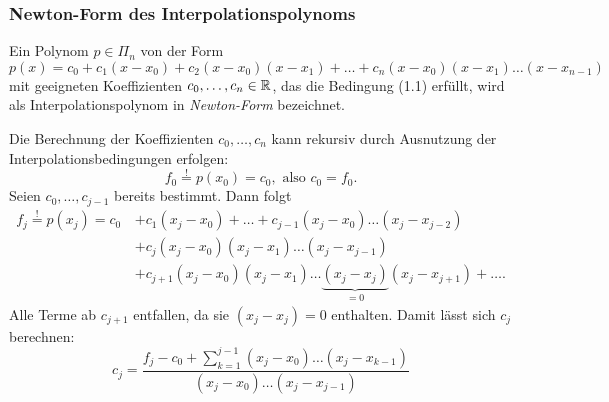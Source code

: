 \documentclass[
 a4paper,
 12pt,
 parskip=half
 ]{scrartcl}
\numberwithin{equation}{section}
\theoremstyle{plain}
\theoremstyle{definition}
\numberwithin{equation}{section}
\begin{document}
\subsubsection{Newton-Form des Interpolationspolynoms}
Ein Polynom $p \in \Pi_n$ von der Form 
\[ p(x) = c_0 + c_1(x-x_0) + c_2(x-x_0)(x-x_1) + \ldots + c_n (x-x_0)(x-x_1) \ldots (x-x_{n-1}) \] mit geeigneten Koeffizienten $c_0, \ldots, c_n \in \mathbb{R}$, das die Bedingung (1.1) erfüllt, wird als Interpolationspolynom in \emph{Newton-Form} bezeichnet.

Die Berechnung der Koeffizienten $c_0, \ldots, c_n$ kann rekursiv durch Ausnutzung der Interpolationsbedingungen erfolgen:
\[ f_0 \overset{!}{=} p(x_0) = c_0, \text{ also } c_0 = f_0. \] 
Seien $c_0, \ldots, c_{j-1}$ bereits bestimmt. Dann folgt
\begin{align*}
 f_j \overset{!}{=} p(x_j) = c_0\, &+ c_1 (x_j-x_0) + \ldots + c_{j-1} (x_j-x_0) \ldots (x_j-x_{j-2}) \\
   &+ c_j (x_j-x_0)(x_j-x_1) \ldots (x_j-x_{j-1}) \\
   &+ c_{j+1} (x_j-x_0)(x_j-x_1) \ldots \underbrace{(x_j-x_j)}_{=0}(x_j-x_{j+1} ) + \ldots . 
\end{align*}
Alle Terme ab $c_{j+1}$ entfallen, da sie $(x_j-x_j)=0$ enthalten. Damit lässt sich $c_j$ berechnen:
\[ c_j = \frac{f_j - c_0 + \sum_{k=1}^{j-1}(x_j-x_0)\ldots(x_j-x_{k-1})}{(x_j-x_0) \ldots (x_j-x_{j-1})} \]
\end{document}
